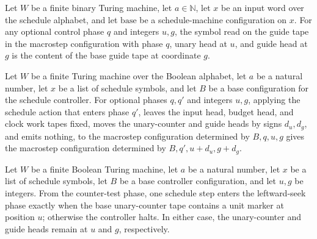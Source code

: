 \begin{lemma}
\label{Complexity.macroCfg_guide}
\leanok
{}
Let $W$ be a finite binary Turing machine, let $a\in\mathbb{N}$, let $x$ be an input
word over the schedule alphabet, and let $\mathrm{base}$ be a schedule-machine
configuration on $x$. For any optional control phase $q$ and integers $u,g$, the symbol
read on the guide tape in the macrostep configuration with phase $q$, unary head at $u$,
and guide head at $g$ is the content of the base guide tape at coordinate $g$.
\end{lemma}

\begin{lemma}
\label{Complexity.macroCfg_apply}
\leanok
{}
Let $W$ be a finite Turing machine over the Boolean alphabet, let $a$ be a natural
number, let $x$ be a list of schedule symbols, and let $B$ be a base configuration for
the schedule controller. For optional phases $q,q'$ and integers $u,g$, applying the
schedule action that enters phase $q'$, leaves the input head, budget head, and clock
work tapes fixed, moves the unary-counter and guide heads by signs $d_u,d_g$, and emits
nothing, to the macrostep configuration determined by $B,q,u,g$ gives the macrostep
configuration determined by $B,q',u+d_u,g+d_g$.
\end{lemma}

\begin{lemma}
\label{Complexity.macroCfg_check}
\leanok
{}
Let $W$ be a finite Boolean Turing machine, let $a$ be a natural number, let $x$ be a
list of schedule symbols, let $B$ be a base controller configuration, and let $u,g$ be
integers. From the counter-test phase, one schedule step enters the leftward-seek phase
exactly when the base unary-counter tape contains a unit marker at position $u$;
otherwise the controller halts. In either case, the unary-counter and guide heads remain
at $u$ and $g$, respectively.
\end{lemma}

